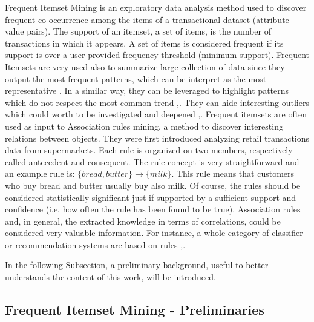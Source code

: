 Frequent Itemset Mining is an exploratory data analysis method used to discover frequent co-occurrence among the items of a transactional dataset (attribute-value pairs). The support of an itemset, a set of items, is the number of transactions in which it appears. A set of items is considered frequent if its support is over a user-provided frequency threshold (minimum support). 
Frequent Itemsets are very used also to summarize large collection of data since they output the most frequent patterns, which can be interpret as the most representative \cite{glatz2014visualizing}. In a similar way, they can be leveraged to highlight patterns which do not respect the most common trend \cite{cagliero2014infrequent},\cite{gupta2011minimally}. They can hide interesting outliers which could worth to be investigated and deepened \cite{paredes2012practical},\cite{brauckhoff2012anomaly}.
Frequent itemsets are often used as input to Association rules mining, a method to discover interesting relations between objects. They were first introduced analyzing retail transactions data from supermarkets. Each rule is organized on two members, respectively called antecedent and consequent. The rule concept is very straightforward and an example rule is: $\{bread, butter\} \rightarrow \{milk\}$. This rule means that customers who buy bread and butter usually buy also milk. Of course, the rules should be considered statistically significant just if supported by a sufficient support and confidence (i.e. how often the rule has been found to be true).
Association rules and, in general, the extracted knowledge in terms of correlations, could be considered very valuable information. For instance, a whole category of classifier or recommendation systems are based on rules \cite{LiuHM98},\cite{Venturini2016}.


In the following Subsection, a preliminary background, useful to better understands the content of this work, will be introduced. 

\subsection{Frequent Itemset Mining - Preliminaries}\label{itemset_preliminaries}

